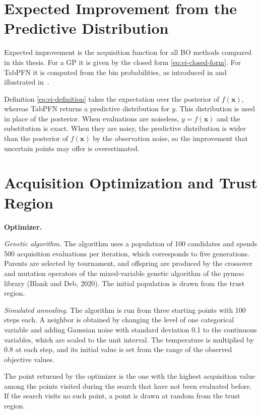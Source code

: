 \section{Expected Improvement from the Predictive Distribution}

Expected improvement is the acquisition function for all BO methods compared in this thesis. For a GP it is given by the closed form \eqref{eq:ei-closed-form}. For TabPFN it is computed from the bin probabilities, as introduced in  and illustrated in~. %

Definition \eqref{eq:ei-definition} takes the expectation over the posterior of $f(\boldsymbol{x})$, whereas TabPFN returns a predictive distribution for $y$. This distribution is used in place of the posterior. When evaluations are noiseless, $y = f(\boldsymbol{x})$ and the substitution is exact. When they are noisy, the predictive distribution is wider than the posterior of $f(\boldsymbol{x})$ by the observation noise, so the improvement that uncertain points may offer is overestimated.

\section{Acquisition Optimization and Trust Region}

\textbf{Optimizer.}

\textit{Genetic algorithm.} The algorithm uses a population of 100 candidates and spends 500 acquisition evaluations per iteration, which corresponds to five generations. Parents are selected by tournament, and offspring are produced by the crossover and mutation operators of the mixed-variable genetic algorithm of the pymoo library (Blank and Deb, 2020). The initial population is drawn from the trust region.

\textit{Simulated annealing.} The algorithm is run from three starting points with 100 steps each. A neighbor is obtained by changing the level of one categorical variable and adding Gaussian noise with standard deviation 0.1 to the continuous variables, which are scaled to the unit interval. The temperature is multiplied by 0.8 at each step, and its initial value is set from the range of the observed objective values.

The point returned by the optimizer is the one with the highest acquisition value among the points visited during the search that have not been evaluated before. If the search visits no such point, a point is drawn at random from the trust region.

